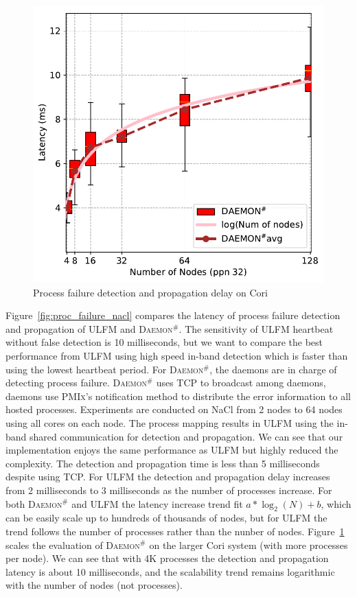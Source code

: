 \documentclass[sigconf]{acmart}
\newcommand{\pmix}[0]{\textsc{PMIx}\xspace}
\newcommand{\ulfm}[0]{\textsc{ULFM}\xspace}
\newcommand{\ourwork}[0]{\textsc{Daemon}\ensuremath{^\#}\xspace}
\begin{document}
\begin{figure}[h]
  \centering
  \includegraphics[width=\linewidth]{Cori_Process_Failure_fit.pdf}
  \caption{Process failure detection and propagation delay on Cori}
  \label{fig:proc_failure_cori}
\end{figure}

Figure~\ref{fig:proc_failure_nacl} compares the latency of process failure detection and propagation of \ulfm and \ourwork. The sensitivity of \ulfm heartbeat without false detection is 10 milliseconds, but we want to compare the best performance from \ulfm using high speed in-band detection which is faster than using the lowest heartbeat period. For \ourwork, the daemons are in charge of detecting process failure. \ourwork uses TCP to broadcast among daemons, daemons use \pmix's notification method to distribute the error information to all hosted processes. Experiments are conducted on NaCl from 2 nodes to 64 nodes using all cores on each node. 
The process mapping results in \ulfm  using the in-band shared communication for detection and propagation. We can see that our implementation enjoys the same performance as \ulfm but highly reduced the complexity. The detection and propagation time is less than 5 milliseconds despite using TCP. For \ulfm the detection and propagation delay increases from 2 milliseconds to 3 milliseconds as the  number of processes increase. For both \ourwork and \ulfm the latency increase trend fit $ a*\log_2(N) + b $, which can be easily scale up to hundreds of thousands of nodes, but for \ulfm 
the trend follows the number of processes rather than the nunber of nodes. Figure~\ref{fig:proc_failure_cori} scales the evaluation of \ourwork on the larger Cori system (with more processes per node). We can see that with 4K processes the detection and propagation latency is about 10 milliseconds, and the scalability trend remains logarithmic with the number of nodes (not processes).  
\end{document}
